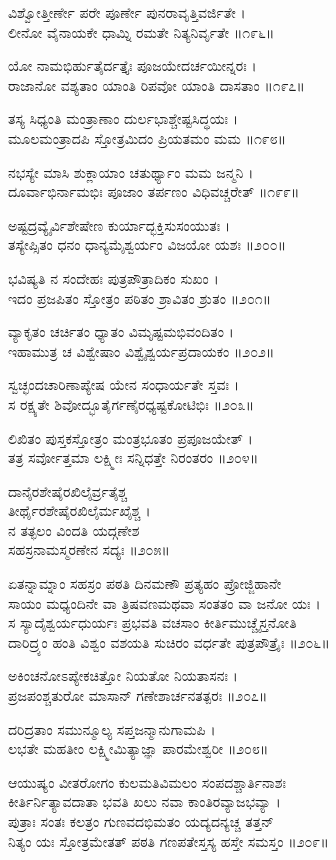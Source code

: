 ವಿಶ್ವೋತ್ತೀರ್ಣೇ ಪರೇ ಪೂರ್ಣೇ ಪುನರಾವೃತ್ತಿವರ್ಜಿತೇ ।\\
ಲೀನೋ ವೈನಾಯಕೇ ಧಾಮ್ನಿ ರಮತೇ ನಿತ್ಯನಿರ್ವೃತೇ ॥೧೯೬॥

ಯೋ ನಾಮಭಿರ್ಹುತೈರ್ದತ್ತೈಃ ಪೂಜಯೇದರ್ಚಯೀನ್ನರಃ ।\\
ರಾಜಾನೋ ವಶ್ಯತಾಂ ಯಾಂತಿ ರಿಪವೋ ಯಾಂತಿ ದಾಸತಾಂ ॥೧೯೭॥

ತಸ್ಯ ಸಿಧ್ಯಂತಿ ಮಂತ್ರಾಣಾಂ ದುರ್ಲಭಾಶ್ಚೇಷ್ಟಸಿದ್ಧಯಃ ।\\
ಮೂಲಮಂತ್ರಾದಪಿ ಸ್ತೋತ್ರಮಿದಂ ಪ್ರಿಯತಮಂ ಮಮ ॥೧೯೮॥

ನಭಸ್ಯೇ ಮಾಸಿ ಶುಕ್ಲಾಯಾಂ ಚತುರ್ಥ್ಯಾಂ ಮಮ ಜನ್ಮನಿ ।\\
ದೂರ್ವಾಭಿರ್ನಾಮಭಿಃ ಪೂಜಾಂ ತರ್ಪಣಂ ವಿಧಿವಚ್ಚರೇತ್ ॥೧೯೯॥

ಅಷ್ಟದ್ರವ್ಯೈರ್ವಿಶೇಷೇಣ ಕುರ್ಯಾದ್ಭಕ್ತಿಸುಸಂಯುತಃ ।\\
ತಸ್ಯೇಪ್ಸಿತಂ ಧನಂ ಧಾನ್ಯಮೈಶ್ವರ್ಯಂ ವಿಜಯೋ ಯಶಃ ॥೨೦೦॥

ಭವಿಷ್ಯತಿ ನ ಸಂದೇಹಃ ಪುತ್ರಪೌತ್ರಾದಿಕಂ ಸುಖಂ ।\\
ಇದಂ ಪ್ರಜಪಿತಂ ಸ್ತೋತ್ರಂ ಪಠಿತಂ ಶ್ರಾವಿತಂ ಶ್ರುತಂ ॥೨೦೧॥

ವ್ಯಾಕೃತಂ ಚರ್ಚಿತಂ ಧ್ಯಾತಂ ವಿಮೃಷ್ಟಮಭಿವಂದಿತಂ ।\\
ಇಹಾಮುತ್ರ ಚ ವಿಶ್ವೇಷಾಂ ವಿಶ್ವೈಶ್ವರ್ಯಪ್ರದಾಯಕಂ ॥೨೦೨॥

ಸ್ವಚ್ಛಂದಚಾರಿಣಾಪ್ಯೇಷ ಯೇನ ಸಂಧಾರ್ಯತೇ ಸ್ತವಃ ।\\
ಸ ರಕ್ಷ್ಯತೇ ಶಿವೋದ್ಭೂತೈರ್ಗಣೈರಧ್ಯಷ್ಟಕೋಟಿಭಿಃ ॥೨೦೩॥

ಲಿಖಿತಂ ಪುಸ್ತಕಸ್ತೋತ್ರಂ ಮಂತ್ರಭೂತಂ ಪ್ರಪೂಜಯೇತ್ ।\\
ತತ್ರ ಸರ್ವೋತ್ತಮಾ ಲಕ್ಷ್ಮೀಃ ಸನ್ನಿಧತ್ತೇ ನಿರಂತರಂ ॥೨೦೪॥

ದಾನೈರಶೇಷೈರಖಿಲೈರ್ವ್ರತೈಶ್ಚ\\
ತೀರ್ಥೈರಶೇಷೈರಖಿಲೈರ್ಮಖೈಶ್ಚ ।\\
ನ ತತ್ಫಲಂ ವಿಂದತಿ ಯದ್ಗಣೇಶ\\
ಸಹಸ್ರನಾಮಸ್ಮರಣೇನ ಸದ್ಯಃ ॥೨೦೫॥

ಏತನ್ನಾಮ್ನಾಂ ಸಹಸ್ರಂ ಪಠತಿ ದಿನಮಣೌ ಪ್ರತ್ಯಹಂ ಪ್ರೋಜ್ಜಿಹಾನೇ\\
 ಸಾಯಂ ಮಧ್ಯಂದಿನೇ ವಾ ತ್ರಿಷವಣಮಥವಾ ಸಂತತಂ ವಾ ಜನೋ ಯಃ ।\\
ಸ ಸ್ಯಾದೈಶ್ವರ್ಯಧುರ್ಯಃ ಪ್ರಭವತಿ ವಚಸಾಂ ಕೀರ್ತಿಮುಚ್ಚೈಸ್ತನೋತಿ\\
 ದಾರಿದ್ರ್ಯಂ ಹಂತಿ ವಿಶ್ವಂ ವಶಯತಿ ಸುಚಿರಂ ವರ್ಧತೇ ಪುತ್ರಪೌತ್ರೈಃ ॥೨೦೬॥

ಅಕಿಂಚನೋಽಪ್ಯೇಕಚಿತ್ತೋ ನಿಯತೋ ನಿಯತಾಸನಃ ।\\
ಪ್ರಜಪಂಶ್ಚತುರೋ ಮಾಸಾನ್ ಗಣೇಶಾರ್ಚನತತ್ಪರಃ ॥೨೦೭॥

ದರಿದ್ರತಾಂ ಸಮುನ್ಮೂಲ್ಯ ಸಪ್ತಜನ್ಮಾನುಗಾಮಪಿ ।\\
ಲಭತೇ ಮಹತೀಂ ಲಕ್ಷ್ಮೀಮಿತ್ಯಾಜ್ಞಾ ಪಾರಮೇಶ್ವರೀ ॥೨೦೮॥

ಆಯುಷ್ಯಂ ವೀತರೋಗಂ ಕುಲಮತಿವಿಮಲಂ ಸಂಪದಶ್ಚಾರ್ತಿನಾಶಃ\\
ಕೀರ್ತಿರ್ನಿತ್ಯಾವದಾತಾ ಭವತಿ ಖಲು ನವಾ ಕಾಂತಿರವ್ಯಾಜಭವ್ಯಾ ।\\
ಪುತ್ರಾಃ ಸಂತಃ ಕಲತ್ರಂ ಗುಣವದಭಿಮತಂ ಯದ್ಯದನ್ಯಚ್ಚ ತತ್ತನ್\\
ನಿತ್ಯಂ ಯಃ ಸ್ತೋತ್ರಮೇತತ್ ಪಠತಿ ಗಣಪತೇಸ್ತಸ್ಯ ಹಸ್ತೇ ಸಮಸ್ತಂ ॥೨೦೯॥

